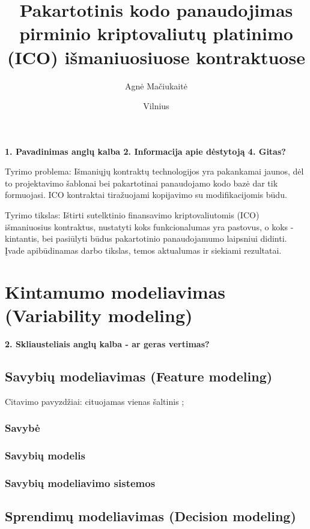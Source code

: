 \documentclass{VUMIFInfKursinis}
\title{Pakartotinis kodo panaudojimas pirminio kriptovaliutų platinimo (ICO) išmaniuosiuose kontraktuose}
\author{Agnė Mačiukaitė}
\date{Vilnius \\ \the\year}
\begin{document}
\maketitle

\tableofcontents

%
\textbf{1. Pavadinimas anglų kalba
2. Informacija apie dėstytoją
4. Gitas?}

Tyrimo problema: Išmaniųjų kontraktų technologijos yra pakankamai jaunos, dėl to projektavimo šablonai bei pakartotinai panaudojamo kodo bazė dar tik formuojasi. ICO kontraktai tiražuojami kopijavimo su modifikacijomis būdu.

Tyrimo tikslas: Ištirti sutelktinio finansavimo kriptovaliutomis (ICO) išmaniuosius kontraktus, nustatyti koks funkcionalumas yra pastovus, o koks - kintantis, bei pasiūlyti būdus pakartotinio panaudojamumo laipsniui didinti.
Įvade apibūdinamas darbo tikslas, temos aktualumas ir siekiami rezultatai.

\section{Kintamumo modeliavimas (Variability modeling)}
\textbf{2. Skliausteliais anglų kalba - ar geras vertimas?}

\subsection{Savybių modeliavimas (Feature modeling)}
Citavimo pavyzdžiai: cituojamas vienas šaltinis \cite{Berger2010};
\subsubsection{Savybė}
\subsubsection{Savybių modelis}
\subsubsection{Savybių modeliavimo sistemos}
\subsection{Sprendimų modeliavimas (Decision modeling)}
\end{document}
